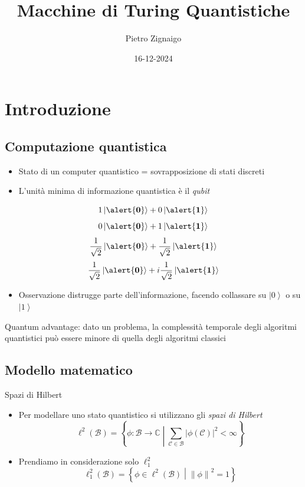 \documentclass{beamer}
\title
{Macchine di Turing Quantistiche}
\author
{Pietro Zignaigo}
\institute
{Università di Genova}
\date
{16-12-2024}
\newcommand{\spacedmiddle}[1]{\mathrel{}\middle#1\mathrel{}}
\newcommand{\Zero}{\alert{\mathbf{0}}}
\newcommand{\One}{\alert{\mathbf{1}}}
\begin{document}
\begin{frame}
	\titlepage
\end{frame}

\begin{frame}
	\tableofcontents
\end{frame}

\section{Introduzione}

\subsection{Computazione quantistica}

\begin{frame}{\subsecname}{}
	\begin{itemize}
		\item Stato di un computer quantistico = sovrapposizione di stati discreti
		\pause \item L'unità minima di informazione quantistica è il \textit{qubit}
	\end{itemize}
	\[ 1 \left | \Zero \right \rangle +  0 \left | \One \right \rangle\]
	\[ 0 \left | \Zero \right \rangle +  1 \left | \One \right \rangle\]
	\[ \frac{1}{\sqrt{2}} \left | \Zero \right \rangle + \frac{1}{\sqrt{2}} \left | \One \right \rangle \]
	\[ \frac{1}{\sqrt{2}} \left | \Zero \right \rangle + i \frac{1}{\sqrt{2}} \left | \One \right \rangle \]
	\begin{itemize}
		\pause \item Osservazione distrugge parte dell'informazione, facendo collassare su \( \left | 0 \right \rangle \) o su \( \left | 1 \right \rangle \)
	\end{itemize}
\end{frame}

\begin{frame}{\subsecname}{}
	Quantum advantage: dato un problema, la complessità temporale degli algoritmi quantistici può essere minore di quella degli algoritmi classici
\end{frame}

\subsection{Modello matematico}

\begin{frame}{\subsecname}{Spazi di Hilbert}
	\begin{itemize}
		\item Per modellare uno stato quantistico si utilizzano gli \textit{spazi di Hilbert}
		\[ \ell^{2} \left ( \mathcal{B} \right ) = \left \{ \phi : \mathcal{B} \rightarrow \mathbb{C} \spacedmiddle | \sum_{\mathcal{C} \in \mathcal{B}} \left | \phi \left ( \mathcal{C} \right ) \right |^{2} < \infty \right \}\]
		\item Prendiamo in considerazione solo \(\ell^{2}_{1}\)
		\[ \ell^{2}_{1} \left ( \mathcal{B} \right ) = \left \{ \phi \in \ell^{2} \left ( \mathcal{B} \right ) \spacedmiddle | \left \| \phi \right \|^{2} = 1 \right \}\]
	\end{itemize}
\end{frame}
\end{document}
